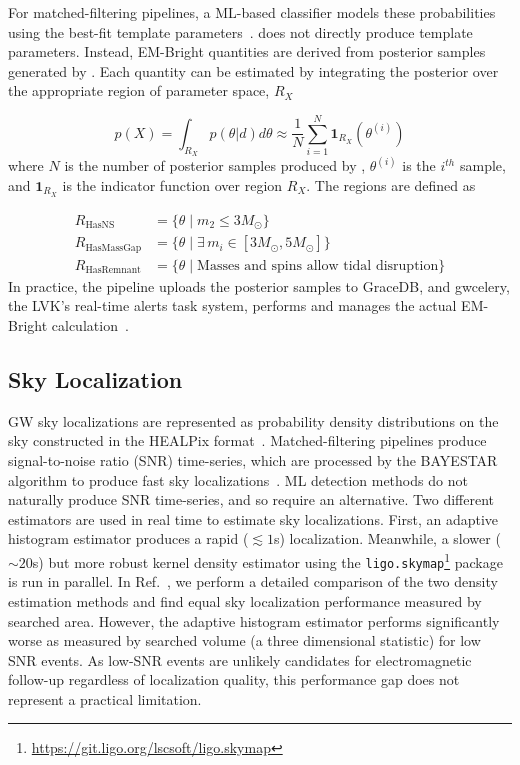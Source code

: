 \begin{refsection}
For matched-filtering pipelines, a ML-based classifier models these probabilities using the best-fit template parameters~\cite{Chatterjee:2019avs}. 
\aframe does not directly produce template parameters. 
Instead, EM-Bright quantities are derived from posterior samples generated by \amplfi. 
Each quantity can be estimated by integrating the posterior over the appropriate region of parameter space, $R_X$

\begin{equation}
    p(X) = \int_{R_X} p(\theta |d) d\theta \approx \frac{1}{N}\sum_{i=1}^{N}\mathbf{1}_{R_X}(\theta^{(i)})
\end{equation}
\noindent where $N$ is the number of posterior samples produced by \amplfi, $\theta^{(i)}$ is the $i^{th}$ sample, and $\mathbf{1}_{R_X}$ is the indicator function over region $R_X$. The regions are defined as

\begin{align}
    R_{\mathrm{HasNS}} &= \{ \theta \mid m_2 \leq 3M_{\odot} \} \\
    R_{\mathrm{HasMassGap}} &= \{ \theta \mid \exists \, m_i \in [3M_{\odot}, 5M_{\odot}] \} \\
    R_{\mathrm{HasRemnant}} &= \{ \theta \mid \text{Masses and spins allow tidal disruption} \}
\end{align}
In practice, the pipeline uploads the posterior samples to GraceDB, and gwcelery, the LVK's real-time alerts task system, performs and manages the actual EM-Bright calculation~\cite{Chaudhary_2024, Magee_2021}.

\subsection{Sky Localization}
GW sky localizations are represented as probability density distributions on the sky constructed in the HEALPix format~\cite{Fernique}. 
Matched-filtering pipelines produce signal-to-noise ratio (SNR) time-series, which are processed by the BAYESTAR algorithm to produce fast sky localizations~\cite{Singer_2016}.
ML detection methods do not naturally produce SNR time-series, and so require an alternative. 
Two different estimators are used in real time to estimate sky localizations. 
First, an adaptive histogram estimator produces a rapid ($\lesssim 1$s) localization. 
Meanwhile, a slower ($\sim 20$s) but more robust kernel density estimator using the \texttt{ligo.skymap}\footnote{\url{https://git.ligo.org/lscsoft/ligo.skymap}} package is run in parallel. 
In Ref.~\cite{Marx:2025ioo}, we perform a detailed comparison of the two density estimation methods and find equal sky localization performance measured by searched area. 
However, the adaptive histogram estimator performs significantly worse as measured by searched volume (a three dimensional statistic) for low SNR events.
As low-SNR events are unlikely candidates for electromagnetic follow-up regardless of localization quality, this performance gap does not represent a practical limitation.


\end{refsection}
